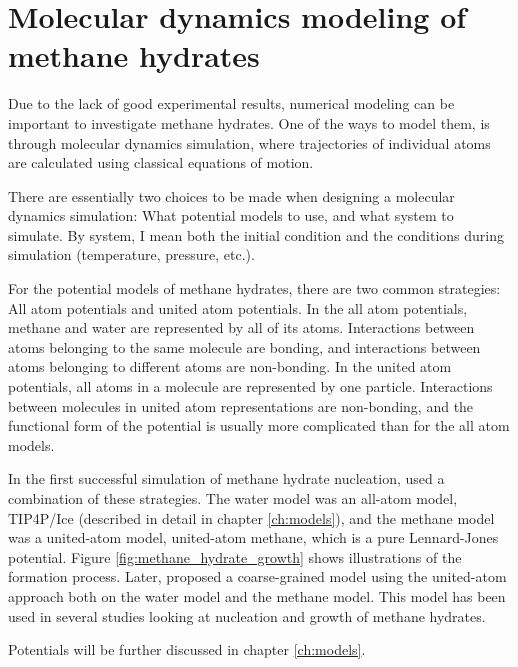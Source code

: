 \section{Molecular dynamics modeling of methane hydrates}
Due to the lack of good experimental results, numerical modeling can be important to investigate methane hydrates. One of the ways to model them, is through molecular dynamics simulation, where trajectories of individual atoms are calculated using classical equations of motion. 

There are essentially two choices to be made when designing a molecular dynamics simulation: What potential models to use, and what system to simulate. By system, I mean both the initial condition and the conditions during simulation (temperature, pressure, etc.).

For the potential models of methane hydrates, there are two common strategies: All atom potentials and united atom potentials. In the all atom potentials, methane and water are represented by all of its atoms. Interactions between atoms belonging to the same molecule are bonding, and interactions between atoms belonging to different atoms are non-bonding. In the united atom potentials, all atoms in a molecule are represented by one particle. Interactions between molecules in united atom representations are non-bonding, and the functional form of the potential is usually more complicated than for the all atom models. 

In the first successful simulation of methane hydrate nucleation, \citet{Walsh2009} used a combination of these strategies. The water model was an all-atom model, TIP4P/Ice (described in detail in chapter \ref{ch:models}), and the methane model was a united-atom model, united-atom methane, which is a pure Lennard-Jones potential. Figure \ref{fig:methane_hydrate_growth} shows illustrations of the formation process.  Later, \citet{Jacobson2010b} proposed a coarse-grained model using the united-atom approach both on the water model and the methane model. This model has been used in several studies looking at nucleation and growth of methane hydrates. 

Potentials will be further discussed in chapter \ref{ch:models}.

